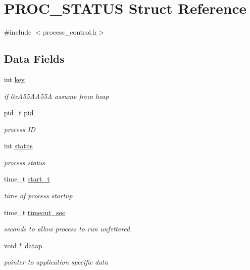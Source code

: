 \hypertarget{struct_p_r_o_c___s_t_a_t_u_s}{\section{P\-R\-O\-C\-\_\-\-S\-T\-A\-T\-U\-S Struct Reference}
\label{struct_p_r_o_c___s_t_a_t_u_s}
}


{\ttfamily \#include $<$process\-\_\-control.\-h$>$}

\subsection*{Data Fields}
\begin{DoxyCompactItemize}
\item 
int \hyperlink{struct_p_r_o_c___s_t_a_t_u_s_a35af0be900467fedbb610bd6ea65ed78}{key}
\begin{DoxyCompactList}\small\item\em if 0x\-A55\-A\-A55\-A assume from heap \end{DoxyCompactList}\item 
pid\-\_\-t \hyperlink{struct_p_r_o_c___s_t_a_t_u_s_ae0d46a978d5cd6707411f276ad869b9c}{pid}
\begin{DoxyCompactList}\small\item\em process I\-D \end{DoxyCompactList}\item 
int \hyperlink{struct_p_r_o_c___s_t_a_t_u_s_a6e27f49150e9a14580fb313cc2777e00}{status}
\begin{DoxyCompactList}\small\item\em process status \end{DoxyCompactList}\item 
time\-\_\-t \hyperlink{struct_p_r_o_c___s_t_a_t_u_s_ae09a7ffbf8cce05233d3479437cefdeb}{start\-\_\-t}
\begin{DoxyCompactList}\small\item\em time of process startup \end{DoxyCompactList}\item 
time\-\_\-t \hyperlink{struct_p_r_o_c___s_t_a_t_u_s_a6a3a80ada7b557528d0a80c9bf9af57a}{timeout\-\_\-sec}
\begin{DoxyCompactList}\small\item\em seconds to allow process to run unfettered. \end{DoxyCompactList}\item 
void $\ast$ \hyperlink{struct_p_r_o_c___s_t_a_t_u_s_aeb5cadc7793d3e5ed0c725dbb3c04491}{datap}
\begin{DoxyCompactList}\small\item\em pointer to application specific data \end{DoxyCompactList}\end{DoxyCompactItemize}


